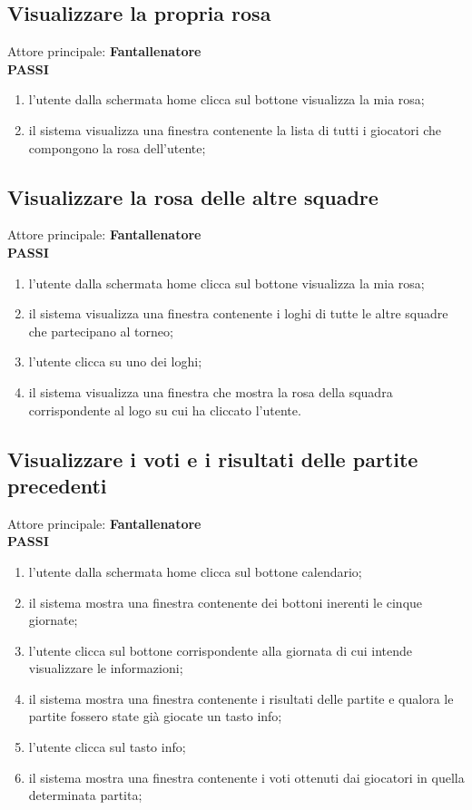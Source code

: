 \documentclass[12pt,a4paper]{article}
\begin{document}
\subsection{Visualizzare la propria rosa}
Attore principale: \textbf{Fantallenatore}\\
\newline
\textbf{PASSI}
\begin{enumerate}
\item l'utente dalla schermata home clicca sul bottone visualizza la mia rosa;
\item il sistema visualizza una finestra contenente la lista di tutti i giocatori che compongono la rosa dell'utente;
\end{enumerate}
\subsection{Visualizzare la rosa delle altre squadre}
Attore principale: \textbf{Fantallenatore}\\
\newline
\textbf{PASSI}
\begin{enumerate}
\item l'utente dalla schermata home clicca sul bottone visualizza la mia rosa;
\item il sistema visualizza una finestra contenente i loghi di tutte le altre squadre che partecipano al torneo;
\item l'utente clicca su uno dei loghi;
\item il sistema visualizza una finestra che mostra la rosa della squadra corrispondente al logo su cui ha cliccato l'utente.
\end{enumerate}
\subsection{Visualizzare i voti e i risultati delle partite precedenti}
Attore principale: \textbf{Fantallenatore}\\
\newline
\textbf{PASSI}
\begin{enumerate}
\item l'utente dalla schermata home clicca sul bottone calendario;
\item il sistema mostra una finestra contenente dei bottoni inerenti le cinque giornate;
\item l'utente clicca sul bottone corrispondente alla giornata di cui intende visualizzare le informazioni;
\item il sistema mostra una finestra contenente i risultati delle partite e qualora le partite fossero state già giocate un tasto info;
\item l'utente clicca sul tasto info;
\item il sistema mostra una finestra contenente i voti ottenuti dai giocatori in quella determinata partita; 
\end{enumerate}
\end{document}
